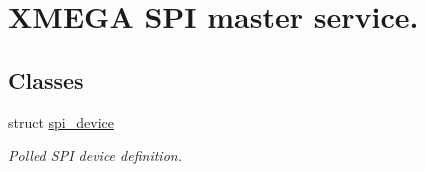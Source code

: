 \hypertarget{group__xmega__spi__master__group}{\section{X\-M\-E\-G\-A S\-P\-I master service.}
\label{group__xmega__spi__master__group}
}
\subsection*{Classes}
\begin{DoxyCompactItemize}
\item 
struct \hyperlink{structspi__device}{spi\-\_\-device}
\begin{DoxyCompactList}\small\item\em Polled S\-P\-I device definition. \end{DoxyCompactList}\end{DoxyCompactItemize}
